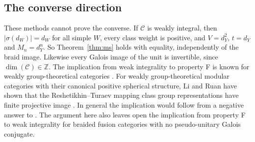 \documentclass[11pt,oneside]{amsart}
\theoremstyle{remark}
\newcommand{\C}{\mathcal C}
\newcommand{\Z}{\mathbb Z}
\begin{document}
\subsection{The converse direction}
These methods cannot prove the converse. If $\C$ is weakly integral, then
$|\sigma(d_W)|=d_W$ for all simple $W$, every class weight is positive, and
$V=d_Y^2$, $t=d_Y$ and $M_n=d_Y^n$. So Theorem~\ref{thm:ms} holds with
equality, independently of the braid image. Likewise every Galois image of the
unit is invertible, since $\dim(\C)\in\Z$. The implication from weak integrality
to property F is known for weakly group-theoretical categories
\cite[Theorem~7.2]{GN}. For weakly group-theoretical modular categories with
their canonical positive spherical structure, Li and Ruan have shown that the
Reshetikhin--Turaev mapping class group representations have finite projective
image \cite{LR}. In general the implication would follow from a negative answer
to \cite[Question~2]{ENO2}. The argument here also
leaves open the implication from property F to weak integrality for braided
fusion categories with no pseudo-unitary Galois conjugate.
\end{document}
